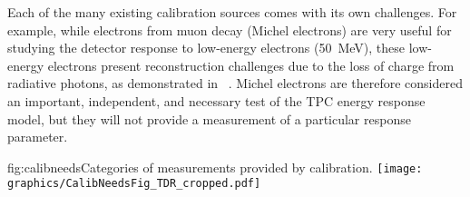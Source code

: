 Each of the many existing calibration sources comes with its own challenges. For example, while electrons from muon decay (Michel electrons) are very useful for studying the detector response to low-energy electrons (\SI{50}{\MeV}), these low-energy electrons present reconstruction challenges due to the loss of charge from radiative photons, as demonstrated in ~\cite{Acciarri:2017sjy}.  
Michel electrons are therefore considered an important, independent, and necessary test of the TPC energy response model, but they will not provide a measurement of a particular response parameter.

\begin{dunefigure}{fig:calibneeds}{Categories of measurements provided by calibration.}
\texttt{[image: graphics/CalibNeedsFig\_TDR\_cropped.pdf]}
\end{dunefigure}

